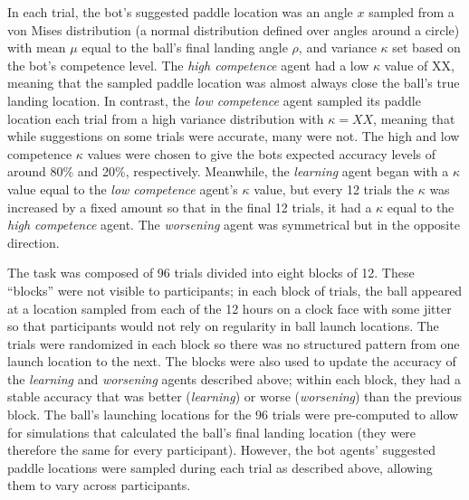 \documentclass[10pt,letterpaper]{article}
\begin{document}
In each trial, the bot's suggested paddle location was an angle $x$ sampled from a von Mises distribution (a normal distribution defined over angles around a circle) with mean $\mu$ equal to the ball's final landing angle $\rho$, and variance $\kappa$ set based on the bot's competence level. The \textit{high competence} agent had a low $\kappa$ value of XX, meaning that the sampled paddle location was almost always close the ball's true landing location. In contrast, the \textit{low competence} agent sampled its paddle location each trial from a high variance distribution with $\kappa = XX$, meaning that while suggestions on some trials were accurate, many were not. The high and low competence $\kappa$ values were chosen to give the bots expected accuracy levels of around 80\% and 20\%, respectively. Meanwhile, the \textit{learning} agent began with a $\kappa$ value equal to the \textit{low competence} agent's $\kappa$ value, but every 12 trials the $\kappa$ was increased by a fixed amount so that in the final 12 trials, it had a $\kappa$ equal to the \textit{high competence} agent. The \textit{worsening} agent was symmetrical but in the opposite direction.

The task was composed of 96 trials divided into eight blocks of 12. These ``blocks'' were not visible to participants; in each block of trials, the ball appeared at a location sampled from each of the 12 hours on a clock face with some jitter so that participants would not rely on regularity in ball launch locations. The trials were randomized in each block so there was no structured pattern from one launch location to the next. The blocks were also used to update the accuracy of the \textit{learning} and \textit{worsening} agents described above; within each block, they had a stable accuracy that was better (\textit{learning}) or worse (\textit{worsening}) than the previous block. The ball's launching locations for the 96 trials were pre-computed to allow for simulations that calculated the ball's final landing location (they were therefore the same for every participant). However, the bot agents' suggested paddle locations were sampled during each trial as described above, allowing them to vary across participants. 
\end{document}
